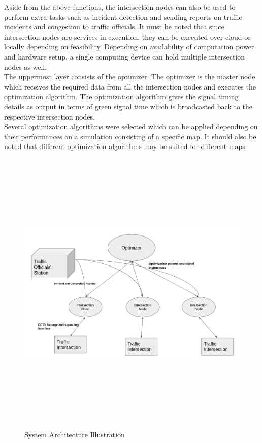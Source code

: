 \documentclass[openany,12pt]{report}
\begin{document}
	\hspace*{0.5in}Aside from the above functions, the intersection nodes can also be used to perform extra tasks such as incident detection and sending reports on traffic incidents and congestion to traffic officials. It must be noted that since intersection nodes are services in execution, they can be executed over cloud or locally depending on feasibility. Depending on availability of computation power and hardware setup, a single computing device can hold multiple intersection nodes as well.\\
	
	\hspace*{0.5in}The uppermost layer consists of the optimizer. The optimizer is the master node which receives the required data from all the intersection nodes and executes the optimization algorithm. The optimization algorithm gives the signal timing details as output in terms of green signal time which is broadcasted back to the respective intersection nodes.\\
	
	\hspace*{0.5in}Several optimization algorithms were selected which can be applied depending on their performances on a simulation consisting of a specific map. It should also be noted that different optimization algorithms may be suited for different maps.\\
	
	\begin{figure}[H]
		\centering
		\includegraphics[width=6.5in,height=5.5in]{./Diagrams/PNG/architecture}
		\caption{System Architecture Illustration}
	\end{figure}
	
\end{document}

